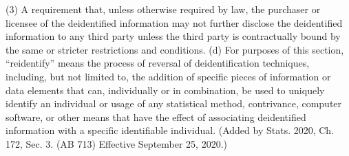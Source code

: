 (3) A requirement that, unless otherwise required by law, the purchaser or licensee of the deidentified information may not further disclose the deidentified information to any third party unless the third party is contractually bound by the same or stricter restrictions and conditions.
(d) For purposes of this section, “reidentify” means the process of reversal of deidentification techniques, including, but not limited to, the addition of specific pieces of information or data elements that can, individually or in combination, be used to uniquely identify an individual or usage of any statistical method, contrivance, computer software, or other means that have the effect of associating deidentified information with a specific identifiable individual.
(Added by Stats. 2020, Ch. 172, Sec. 3. (AB 713) Effective September 25, 2020.)

